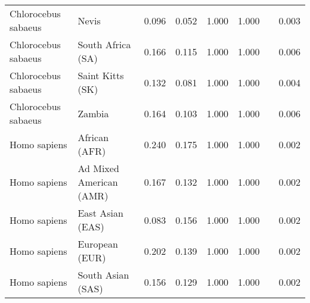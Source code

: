 \begin{center}
\begin{adjustbox}{width = 1\textwidth}
\begin{tabular}{|l|l|r|r|r|r|r|}
 Chlorocebus sabaeus &                           Nevis &                                              0.096 &                                              0.052 &                1.000 &                                  1.000~~ &              0.003 \\
 Chlorocebus sabaeus &               South Africa (SA) &                                              0.166 &                                              0.115 &                1.000 &                                  1.000~~ &              0.006 \\
 Chlorocebus sabaeus &                Saint Kitts (SK) &                                              0.132 &                                              0.081 &                1.000 &                                  1.000~~ &              0.004 \\
 Chlorocebus sabaeus &                          Zambia &                                              0.164 &                                              0.103 &                1.000 &                                  1.000~~ &              0.006 \\
        Homo sapiens &                   African (AFR) &                                              0.240 &                                              0.175 &                1.000 &                                  1.000~~ &              0.002 \\
        Homo sapiens &         Ad Mixed American (AMR) &                                              0.167 &                                              0.132 &                1.000 &                                  1.000~~ &              0.002 \\
        Homo sapiens &                East Asian (EAS) &                                              0.083 &                                              0.156 &                1.000 &                                  1.000~~ &              0.002 \\
        Homo sapiens &                  European (EUR) &                                              0.202 &                                              0.139 &                1.000 &                                  1.000~~ &              0.002 \\
        Homo sapiens &               South Asian (SAS) &                                              0.156 &                                              0.129 &                1.000 &                                  1.000~~ &              0.002 \\
\bottomrule
\end{tabular}
\end{adjustbox}
\newpage
\end{center}
